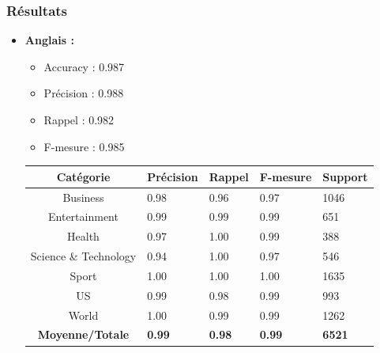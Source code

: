         \subsubsection{Résultats}
        \begin{itemize}
            \item{\textbf{Anglais :}}
            \begin{itemize}
                \item{Accuracy : 0.987}
                \item{Précision : 0.988}
                \item{Rappel : 0.982}
                \item{F-mesure : 0.985}
            \end{itemize}
            \begin{table}[H]
                    \begin{center}
                        \begin{tabular}{|c|C{2cm}|C{2cm}|C{2cm}|C{2cm}|}
                            \hline
                            \textbf{Catégorie} &  \textbf{Précision} &  \textbf{Rappel} &  \textbf{F-mesure} &  \textbf{Support} \\
                            \hline
                            Business & 0.98 & 0.96 & 0.97 & 1046 \\
                            \hline
                            Entertainment & 0.99 & 0.99 & 0.99 & 651 \\
                            \hline
                            Health & 0.97 & 1.00 & 0.99 & 388 \\
                            \hline
                            Science \& Technology & 0.94 & 1.00 & 0.97 & 546 \\
                            \hline
                            Sport & 1.00 & 1.00 & 1.00 & 1635 \\
                            \hline
                            US & 0.99 & 0.98 & 0.99 & 993 \\
                            \hline
                            World & 1.00 & 0.99 & 0.99 & 1262 \\
                            \hline                            
                            \textbf{Moyenne/Totale} & \textbf{0.99} & \textbf{0.98} & \textbf{0.99} & \textbf{6521} \\
                            \hline
                        \end{tabular}
                    \end{center}

\end{table}
\end{itemize}
